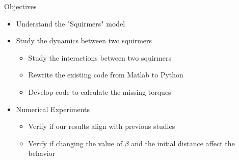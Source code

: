 \documentclass{beamer}
\begin{document}
\begin{frame}{Objectives}
    \begin{itemize}
        \item Understand the "Squirmers" model
        \item Study the dynamics between two squirmers
        \begin{itemize}
            \item Study the interactions between two squirmers \cite{Brumley}\cite{Lauga}
            \item Rewrite the existing code from Matlab to Python
            \item Develop code to calculate the missing torques
        \end{itemize}
        \item Numerical Experiments
        \begin{itemize}
            \item Verify if our results align with previous studies\cite{Brumley}\cite{Lauga}\cite{Stark}
            \item Verify if changing the value of $\beta$ and the initial distance affect the behavior
        \end{itemize}
    \end{itemize}
\end{frame}
\end{document}
